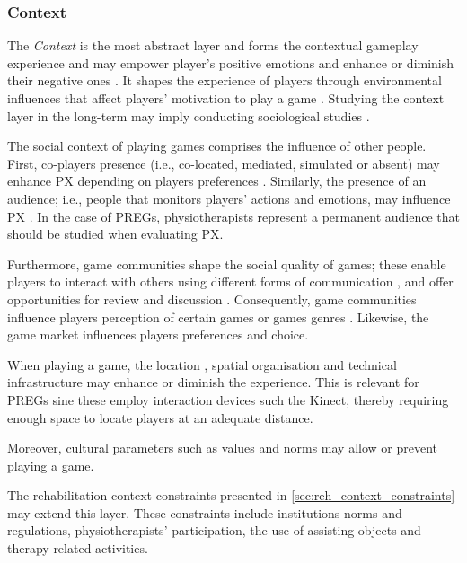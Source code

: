 \subsubsection*{Context}

The \textit{Context} is the most abstract layer and forms the contextual gameplay experience and may empower player's positive emotions and enhance or diminish their negative ones \autocite{DeKort2007b}. It shapes the experience of players through environmental influences that affect players' motivation to play a game \autocite{Elson2014}. Studying the context layer in the long-term may imply conducting sociological studies \autocite{Nacked}.

The social context of playing games \autocite{Mayra,DeKort2007b,Elson2014} comprises the influence of other people. First, co-players presence \autocite{Nacked,Nackea2,Nackea,DeKort2007b,Elson2014,Mayra} (i.e., co-located, mediated, simulated or absent) may enhance \ac{PX} depending on players preferences \autocite{DeKort2007b}. Similarly, the presence of an audience; i.e., people that monitors players' actions and emotions, may influence \ac{PX} \autocite{DeKort2007b,Mayra,Nackea2}. In the case of \acp{PREG}, physiotherapists represent a permanent audience that should be studied when evaluating \ac{PX}. 

Furthermore, game communities \autocite{Nacked,Nackea2,Elson2014} shape the social quality of games; these enable players to interact with others using different forms of communication \autocite{Elson2014}, and offer opportunities for review and discussion \autocite{Nacked}. Consequently, game communities influence players perception of certain games or games genres \autocite{Nackea,Nackea2}. Likewise, the game market \autocite{Elson2014,Nackea} influences players preferences and choice.

When playing a game, the location \autocite{Engl2013,Elson2014}, spatial organisation \autocite{DeKort2007b} and technical infrastructure \autocite{Elson2014} may enhance or diminish the experience. This is relevant for \acp{PREG} sine these employ interaction devices such the Kinect, thereby requiring enough space to locate players at an adequate distance.

Moreover, cultural parameters such as values and norms \autocite{Elson2014,Mayra} may allow or prevent playing a game.

The rehabilitation context constraints presented in \autoref{sec:reh_context_constraints} may extend this layer. These constraints include institutions norms and regulations, physiotherapists' participation, the use of assisting objects and therapy related activities.

